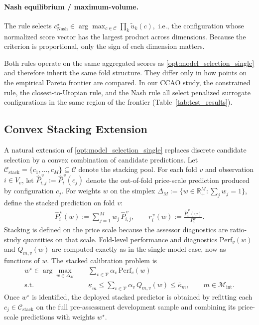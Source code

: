 \documentclass{article}
\theoremstyle{plain}
\theoremstyle{definition}
\newcommand{\R}{\mathbb{R}}
\newcommand{\1}{\mathbf{1}}
\renewcommand{\R}{\mathbb{R}}
\begin{document}
\paragraph{Nash equilibrium / maximum-volume.}
The rule selects
$
c^\star_{\text{Nash}} \in \arg\max_{c\in\mathcal C} \prod_{k} \tilde u_k(c),
$
i.e., the configuration whose normalized score vector has the largest product across dimensions. Because the criterion is proportional, only the sign of each dimension matters.

Both rules operate on the same aggregated scores as \eqref{opt:model_selection_single} and therefore inherit the same fold structure. They differ only in how points on the empirical Pareto frontier are compared. In our CCAO study, the constrained rule, the closest-to-Utopian rule, and the Nash rule all select penalized surrogate configurations in the same region of the frontier (Table~\ref{tab:test_results}).

\subsection{Convex Stacking Extension}
\label{app:stacking}

A natural extension of \eqref{opt:model_selection_single} replaces discrete candidate selection by a convex combination of candidate predictions. Let $\mathcal C_{\mathrm{stack}}=\{c_1,\dots,c_M\}\subseteq\mathcal C$ denote the stacking pool. For each fold $v$ and observation $i\in V_v$, let $\hat P_{i,j}^{\,v}:=\hat P_i^{\,v}(c_j)$ denote the out-of-fold price-scale prediction produced by configuration $c_j$. For weights $w$ on the simplex $\Delta_M:=\{w\in\R_+^M:\sum_j w_j=1\}$, define the stacked prediction on fold $v$:
\begin{align}
    \label{eq:stacked_prediction}
    \hat P_i^{\,v}(w)
    :=
    \sum_{j=1}^M w_j\,\hat P_{i,j}^{\,v},
    \qquad
    r_i^{\,v}(w)
    :=
    \frac{\hat P_i^{\,v}(w)}{P_i^{\,v}}.
\end{align}
Stacking is defined on the price scale because the assessor diagnostics are ratio-study quantities on that scale. Fold-level performance and diagnostics $\mathrm{Perf}_v(w)$ and $Q_{m,v}(w)$ are computed exactly as in the single-model case, now as functions of $w$. The stacked calibration problem is
\begin{align}
    \label{opt:model_selection_stacking}
    w^\star
    \in
    \arg\max_{w\in\Delta_M}
    \quad
    & \sum_{v\in\mathcal V}\alpha_v\,\mathrm{Perf}_v(w)
    \\
    \text{s.t.}\quad
    & \underline{\kappa}_m
      \le
      \sum_{v\in\mathcal V}\alpha_v\,Q_{m,v}(w)
      \le
      \overline{\kappa}_m,
      \qquad
      m\in\mathcal M_{\mathrm{int}}.
      \nonumber
\end{align}
Once $w^\star$ is identified, the deployed stacked predictor is obtained by refitting each $c_j\in\mathcal C_{\mathrm{stack}}$ on the full pre-assessment development sample and combining its price-scale predictions with weights $w^\star$.
\end{document}
